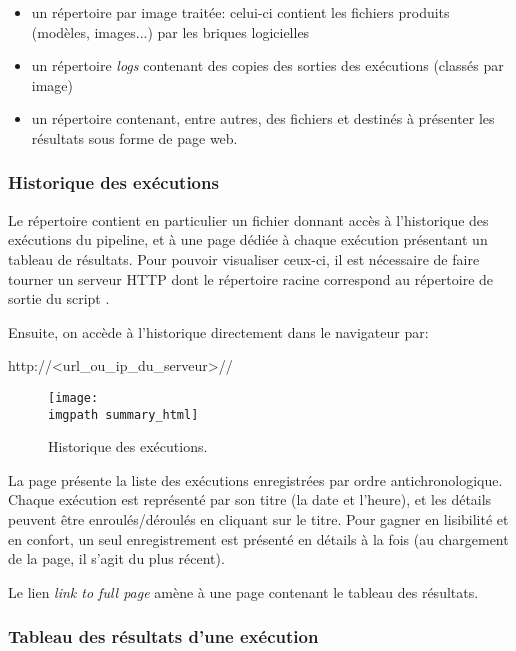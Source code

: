 \begin{itemize}
	\item un répertoire par image traitée: celui-ci contient les fichiers produits (modèles, images...) par les briques logicielles
	\item un répertoire \textit{logs} contenant des copies des sorties des exécutions (classés par image)
	\item un répertoire \resultsDataBase contenant, entre autres, des fichiers \html et \json destinés à présenter les résultats sous forme de page web.
\end{itemize}


	\subsubsection{Historique des exécutions}

Le répertoire \resultsDataBase contient en particulier un fichier \summaryHtml donnant accès à l'historique des exécutions du pipeline, et à une page dédiée à chaque exécution présentant un tableau de résultats. Pour pouvoir visualiser ceux-ci, il est nécessaire de faire tourner un serveur HTTP dont le répertoire racine correspond au répertoire de sortie du script \masterpy.

Ensuite, on accède à l'historique directement dans le navigateur par:

http://<url\_ou\_ip\_du\_serveur>/\resultsDataBase/\summaryHtml

\begin{figure}[H]
\label{fig:summary_html}
\begin{center}
  \texttt{[image: \\imgpath summary\_html]}
  \caption*{Historique des exécutions.}
\end{center}
\end{figure}

La page présente la liste des exécutions enregistrées par ordre antichronologique. Chaque exécution est représenté par son titre (la date et l'heure), et les détails peuvent être enroulés/déroulés en cliquant sur le titre. Pour gagner en lisibilité et en confort, un seul enregistrement est présenté en détails à la fois (au chargement de la page, il s'agit du plus récent).

Le lien \textit{link to full page} amène à une page contenant le tableau des résultats. 


	\subsubsection{Tableau des résultats d'une exécution}
	
